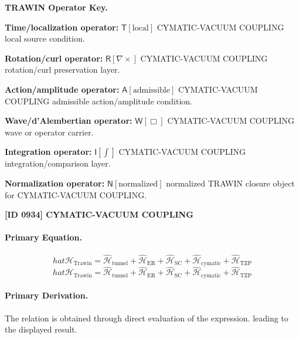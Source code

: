 \par\vspace{0.45\baselineskip}
\noindent\begin{minipage}[t]{\linewidth}
\begingroup
\small
\raggedright
\textbf{TRAWIN Operator Key.}\par
\noindent\textbf{Time/localization operator:} $\mathsf{T}\!\left[\mathrm{local}\right]$ CYMATIC-VACUUM COUPLING local source condition.\par
\noindent\textbf{Rotation/curl operator:} $\mathsf{R}\!\left[\nabla\times\right]$ CYMATIC-VACUUM COUPLING rotation/curl preservation layer.\par
\noindent\textbf{Action/amplitude operator:} $\mathsf{A}\!\left[\mathrm{admissible}\right]$ CYMATIC-VACUUM COUPLING admissible action/amplitude condition.\par
\noindent\textbf{Wave/d'Alembertian operator:} $\mathsf{W}\!\left[\Box\right]$ CYMATIC-VACUUM COUPLING wave or operator carrier.\par
\noindent\textbf{Integration operator:} $\mathsf{I}\!\left[\int\right]$ CYMATIC-VACUUM COUPLING integration/comparison layer.\par
\noindent\textbf{Normalization operator:} $\mathsf{N}\!\left[\mathrm{normalized}\right]$ normalized TRAWIN closure object for CYMATIC-VACUUM COUPLING.\par
\endgroup
\end{minipage}

\clearpage
\noindent\textbf{[ID 0934] CYMATIC-VACUUM COUPLING}\par
\vspace{0.35em}
\paragraph{Primary Equation.}
\[
hat{\mathcal{H}}_{\text{Trawin}} = \hat{\mathcal{H}}_{\text{tunnel}} + \hat{\mathcal{H}}_{\text{ER}} + \hat{\mathcal{H}}_{\text{SC}} + \hat{\mathcal{H}}_{\text{cymatic}} + \hat{\mathcal{H}}_{\text{TZP}}
\]
\[
hat{\mathcal{H}}_{\text{Trawin}} = \hat{\mathcal{H}}_{\text{tunnel}} + \hat{\mathcal{H}}_{\text{ER}} + \hat{\mathcal{H}}_{\text{SC}} + \hat{\mathcal{H}}_{\text{cymatic}} + \hat{\mathcal{H}}_{\text{TZP}}
\]

\paragraph{Primary Derivation.}
The relation is obtained through direct evaluation of the expression. leading to the displayed result.
